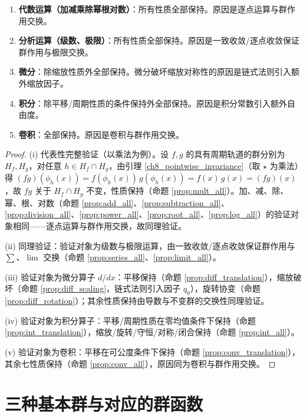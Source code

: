 \begin{theorem}[传递性矩阵的总体规律]\label{thm:transitivity_pattern}
\begin{enumerate}[label=(\roman*)]
    \item \textbf{代数运算（加减乘除幂根对数）}：所有性质全部保持。原因是逐点运算与群作用交换。
    \item \textbf{分析运算（级数、极限）}：所有性质全部保持。原因是一致收敛/逐点收敛保证群作用与极限交换。
    \item \textbf{微分}：除缩放性质外全部保持。微分破坏缩放对称性的原因是链式法则引入额外缩放因子。
    \item \textbf{积分}：除平移/周期性质的条件保持外全部保持。原因是积分常数引入额外自由度。
    \item \textbf{卷积}：全部保持。原因是卷积与群作用交换。
\end{enumerate}
\end{theorem}

\begin{proof}
(i) 代表性完整验证（以乘法为例）。设 $f,g$ 的具有周期轨道的群分别为 $H_f,H_g$，对任意 $h\in H_f\cap H_g$，由引理 \ref{ch8_pointwise_invariance}（取 $\star$ 为乘法）得 $(fg)(\phi_h(x))=f(\phi_h(x))\,g(\phi_h(x))=f(x)\,g(x)=(fg)(x)$，故 $fg$ 关于 $H_f\cap H_g$ 不变，性质保持（命题 \ref{prop:mult_all}）。加、减、除、幂、根、对数（命题 \ref{prop:add_all}、\ref{prop:subtraction_all}、\ref{prop:division_all}、\ref{prop:power_all}、\ref{prop:root_all}、\ref{prop:log_all}）的验证对象相同——逐点运算与群作用交换，故同理验证。

(ii) 同理验证：验证对象为级数与极限运算，由一致收敛/逐点收敛保证群作用与 $\sum$、$\lim$ 交换（命题 \ref{prop:series_all}、\ref{prop:limit_all}）。

(iii) 验证对象为微分算子 $d/dx$：平移保持（命题 \ref{prop:diff_translation}），缩放破坏（命题 \ref{prop:diff_scaling}，链式法则引入因子 $q_0$），旋转协变（命题 \ref{prop:diff_rotation}）；其余性质保持由导数与不变群的交换性同理验证。

(iv) 验证对象为积分算子：平移/周期性质在零均值条件下保持（命题 \ref{prop:int_translation}），缩放/旋转/守恒/对称/闭合保持（命题 \ref{prop:int_all}）。

(v) 验证对象为卷积：平移在可公度条件下保持（命题 \ref{prop:conv_translation}），其余七性质保持（命题 \ref{prop:conv_all}），原因同为卷积与群作用交换。
\end{proof}

\section{\texorpdfstring{三种基本群与对应的群函数}{三种基本群与对应的群函数}}

